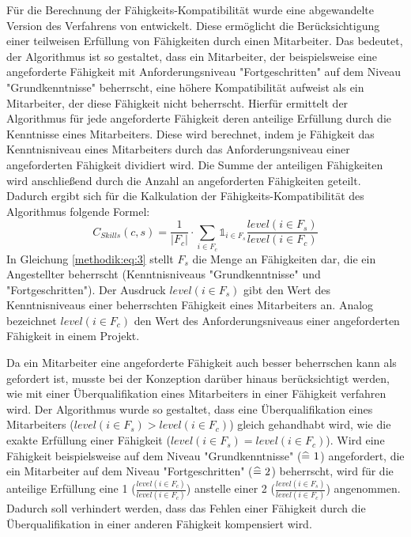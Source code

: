 Für die Berechnung der Fähigkeits-Kompatibilität wurde eine abgewandelte Version des Verfahrens von \textcite[S. 269ff.]{pizzato:2:inproceedings} entwickelt.
Diese ermöglicht die Berücksichtigung einer teilweisen Erfüllung von Fähigkeiten durch einen Mitarbeiter.
Das bedeutet, der Algorithmus ist so gestaltet, dass ein Mitarbeiter, der beispielsweise eine angeforderte Fähigkeit mit Anforderungsniveau "Fortgeschritten" auf dem Niveau "Grundkenntnisse" beherrscht, eine höhere Kompatibilität aufweist als ein Mitarbeiter, der diese Fähigkeit nicht beherrscht.
Hierfür ermittelt der Algorithmus für jede angeforderte Fähigkeit deren anteilige Erfüllung durch die Kenntnisse eines Mitarbeiters.
Diese wird berechnet, indem je Fähigkeit das Kenntnisniveau eines Mitarbeiters durch das Anforderungsniveau einer angeforderten Fähigkeit dividiert wird.
Die Summe der anteiligen Fähigkeiten wird anschließend durch die Anzahl an angeforderten Fähigkeiten geteilt.
Dadurch ergibt sich für die Kalkulation der Fähigkeits-Kompatibilität des Algorithmus folgende Formel:
\begin{equation}\label{methodik:eq:3}
    C_{Skills}(c,s)=\frac{1}{|F_{c}|} \cdot \sum\limits_{i \in F_{c}} \mathbb{1}_{i \in F_{s}} \frac{level(i \in F_{s})}{level(i \in F_{c})}
\end{equation}
In Gleichung \ref{methodik:eq:3} stellt $F_{s}$ die Menge an Fähigkeiten dar, die ein Angestellter beherrscht (Kenntnisniveaus "Grundkenntnisse" und "Fortgeschritten").
Der Ausdruck $level(i \in F_{s})$ gibt den Wert des Kenntnisniveaus einer beherrschten Fähigkeit eines Mitarbeiters an.
Analog bezeichnet $level(i \in F_{c})$ den Wert des Anforderungsniveaus einer angeforderten Fähigkeit in einem Projekt.

Da ein Mitarbeiter eine angeforderte Fähigkeit auch besser beherrschen kann als gefordert ist, musste bei der Konzeption darüber hinaus berücksichtigt werden, wie mit einer Überqualifikation eines Mitarbeiters in einer Fähigkeit verfahren wird.
Der Algorithmus wurde so gestaltet, dass eine Überqualifikation eines Mitarbeiters ($level(i \in F_{s}) > level(i \in F_{c})$) gleich gehandhabt wird, wie die exakte Erfüllung einer Fähigkeit ($level(i \in F_{s}) = level(i \in F_{c})$).
Wird eine Fähigkeit beispielsweise auf dem Niveau "Grundkenntnisse" ($\widehat{=} \textnormal{ }1$) angefordert, die ein Mitarbeiter auf dem Niveau "Fortgeschritten" ($\widehat{=} \textnormal{ }2$) beherrscht, wird für die anteilige Erfüllung eine 1 ($\frac{level(i \in F_{c})}{level(i \in F_{c})}$) anstelle einer 2 ($\frac{level(i \in F_{s})}{level(i \in F_{c})}$) angenommen.
Dadurch soll verhindert werden, dass das Fehlen einer Fähigkeit durch die Überqualifikation in einer anderen Fähigkeit kompensiert wird.

